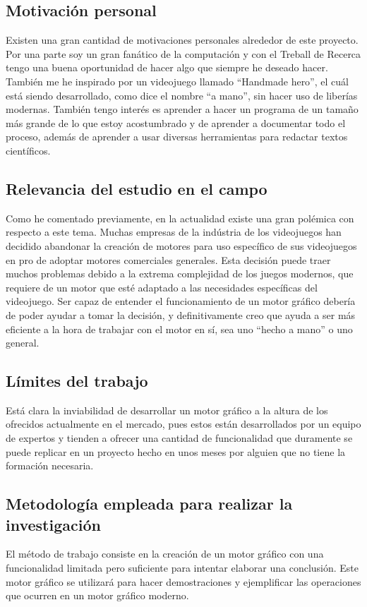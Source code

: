 \documentclass{article}
\begin{document}
\subsection{Motivación personal}
Existen una gran cantidad de motivaciones personales alrededor de este proyecto. Por una parte soy un gran fanático de la computación y con el Treball de Recerca tengo una buena oportunidad de hacer algo que siempre he deseado hacer. También me he inspirado por un videojuego llamado ``Handmade hero'', el cuál está siendo desarrollado, como dice el nombre ``a mano'', sin hacer uso de liberías modernas. También tengo interés es aprender a hacer un programa de un tamaño más grande de lo que estoy acostumbrado y de aprender a documentar todo el proceso, además de aprender a usar diversas herramientas para redactar textos científicos.
\subsection{Relevancia del estudio en el campo}
Como he comentado previamente, en la actualidad existe una gran polémica con respecto a este tema. Muchas empresas de la indústria de los videojuegos han decidido abandonar la creación de motores para uso específico de sus videojuegos en pro de adoptar motores comerciales generales. Esta decisión puede traer muchos problemas debido a la extrema complejidad de los juegos modernos, que requiere de un motor que esté adaptado a las necesidades específicas del videojuego.
\newline
Ser capaz de entender el funcionamiento de un motor gráfico debería de poder ayudar a tomar la decisión, y definitivamente creo que ayuda a ser más eficiente a la hora de trabajar con el motor en sí, sea uno ``hecho a mano'' o uno general.
\subsection{Límites del trabajo}
Está clara la inviabilidad de desarrollar un motor gráfico a la altura de los ofrecidos actualmente en el mercado, pues estos están desarrollados por un equipo de expertos y tienden a ofrecer una cantidad de funcionalidad que duramente se puede replicar en un proyecto hecho en unos meses por alguien que no tiene la formación necesaria.
\subsection{Metodología empleada para realizar la investigación}
El método de trabajo consiste en la creación de un motor gráfico con una funcionalidad limitada pero suficiente para intentar elaborar una conclusión. Este motor gráfico se utilizará para hacer demostraciones y ejemplificar las operaciones que ocurren en un motor gráfico moderno.
\end{document}
